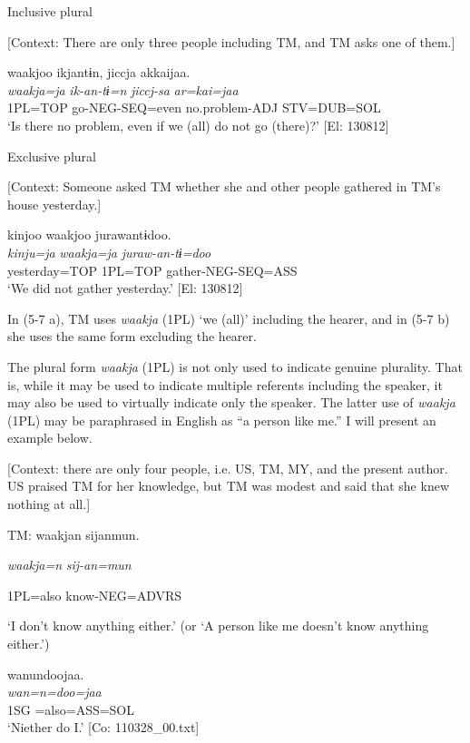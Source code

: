\ea \label{ex:5:7}  \ea \label{ex:5:7a} Inclusive plural

    [Context: There are only three people including TM, and TM asks one of them.]

\glll  waakjoo  ikjantɨn,  jiccja  akkaijaa.\\
\textit{waakja=ja}  \textit{ik-an-tɨ=n}  \textit{jiccj-sa}  \textit{ar=kai=jaa}\\
1PL=TOP  go-NEG-SEQ=even  no.problem-ADJ  STV=DUB=SOL\\
\glt ‘Is there no problem, even if we (all) do not go (there)?’ [El: 130812]

 \ex \label{ex:5:b} Exclusive plural

    [Context: Someone asked TM whether she and other people gathered in TM’s house yesterday.]

\glll  kinjoo  waakjoo  jurawantɨdoo.\\
\textit{kinju=ja}  \textit{waakja=ja}  \textit{juraw-an-tɨ=doo}\\
yesterday=TOP  1PL=TOP  gather-NEG-SEQ=ASS\\
\glt ‘We did not gather yesterday.’ [El: 130812]
\z
\z

In (5-7 a), TM uses \textit{waakja} (1PL) ‘we (all)’ including the hearer, and in (5-7 b) she uses the same form excluding the hearer.

  The plural form \textit{waakja} (1PL) is not only used to indicate genuine plurality. That is, while it may be used to indicate multiple referents including the speaker, it may also be used to virtually indicate only the speaker. The latter use of \textit{waakja} (1PL) may be paraphrased in English as “a person like me.” I will present an example below.

\ea \label{ex:5:8}   [Context: there are only four people, i.e. US, TM, MY, and the present author. US praised TM for her knowledge, but TM was modest and said that she knew nothing at all.]

  TM:  waakjan  sijanmun.

    \textit{waakja=n}  \textit{sij-an=mun}

    1PL=also  know-NEG=ADVRS

    ‘I don’t know anything either.’ (or ‘A person like me doesn’t know anything either.’)

\glll  wanundoojaa.\\
\textit{wan=n=doo=jaa}\\
1SG =also=ASS=SOL\\
\glt ‘Niether do I.’ [Co: 110328\_00.txt]
\z


